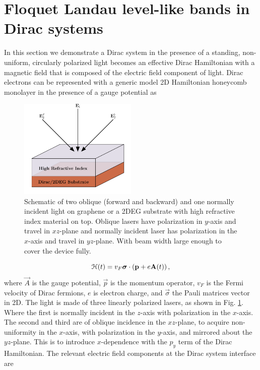 \section{Floquet Landau level-like bands in Dirac systems}
In this section we demonstrate a Dirac system in the presence of a standing, non-uniform, circularly polarized light becomes an effective Dirac Hamiltonian with a magnetic field that is composed of the electric field component of light.
Dirac electrons can be represented with a generic model 2D Hamiltonian honeycomb monolayer in the presence of a gauge potential as

\begin{figure}
  \includegraphics[width=0.5\textwidth]{./figures/fll-setup.pdf}
  \caption{Schematic of two oblique (forward and backward) and one normally incident light on graphene or a 2DEG substrate with high refractive index material on top. Oblique lasers have polarization in $y$-axis and travel in $xz$-plane and normally incident laser has polarization in the $x$-axis and travel in $yz$-plane. With beam width large enough to cover the device fully.}
  \label{fig:fll-setup}
\end{figure}

\begin{equation}\label{eq:HDirac}
  \mathcal{H}(t) = v_{F} \bm{\sigma} \cdot \left(\mathbf{p} + e\mathbf{A}(t)\right),
\end{equation}
where $\vec{A}$ is the gauge potential, $\vec{p}$ is the momentum operator, $v_F$ is the Fermi velocity of Dirac fermions, $e$ is electron charge, and $\vec{\sigma}$ the Pauli matrices vector in 2D.
The light is made of three linearly polarized lasers, as shown in Fig. \ref{fig:fll-setup}.
Where the first is normally incident in the $z$-axis with polarization in the $x$-axis.
The second and third are of oblique incidence in the $xz$-plane, to acquire non-uniformity in the $x$-axis, with polarization in the $y$-axis, and mirrored about the $yz$-plane.
This is to introduce $x$-dependence with the $p_y$ term of the Dirac Hamiltonian.
The relevant electric field components at the Dirac system interface are

